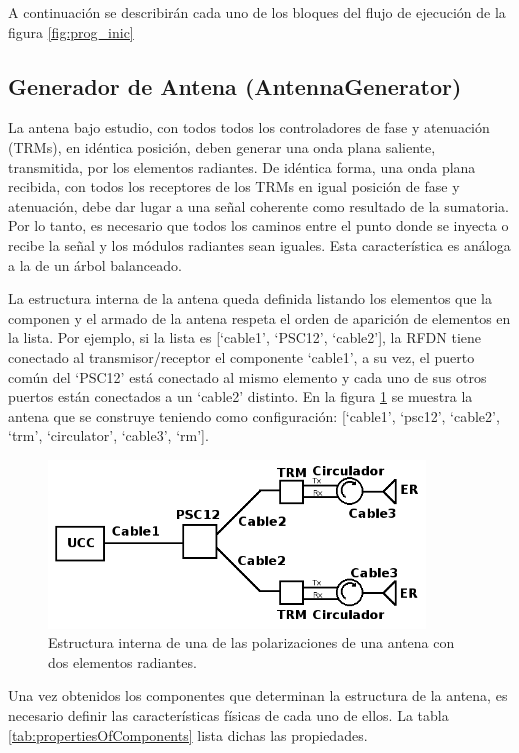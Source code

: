 A continuación se describirán cada uno de los bloques del flujo de ejecución de la figura \ref{fig:prog_inic}

\subsection{Generador de Antena (AntennaGenerator)}

La antena bajo estudio, con todos todos los controladores de fase y atenuación (TRMs), en idéntica posición, deben generar una
onda plana saliente, transmitida, por los elementos radiantes. De idéntica forma, una onda plana recibida, con todos los
receptores de los TRMs en igual posición de fase y atenuación, debe dar lugar a una señal coherente como resultado de la
sumatoria. Por lo tanto, es necesario que todos los caminos entre el punto donde se inyecta o recibe la señal y los módulos 
radiantes sean iguales. Esta característica es análoga a la de un árbol balanceado. 

La estructura interna de la antena queda definida listando los elementos que la componen y el armado de la antena respeta el
orden de aparición de elementos en la lista. Por ejemplo, si la lista es [\enquote*{cable1}, \enquote*{PSC12},
\enquote*{cable2}], la RFDN tiene conectado al transmisor/receptor el componente \enquote*{cable1}, a su vez, el puerto común
del \enquote*{PSC12} está conectado al mismo elemento y cada uno de sus otros puertos están conectados a un \enquote*{cable2}
distinto. En la figura \ref{fig:2RMAntenna} se muestra la antena que se construye teniendo como configuración:
[\enquote*{cable1}, \enquote*{psc12}, \enquote*{cable2}, \enquote*{trm}, \enquote*{circulator}, \enquote*{cable3},
\enquote*{rm}].

\begin{figure}
 \centering
 \includegraphics[width=10cm]{gfx/RFDN.png}
 \caption{Estructura interna de una de las polarizaciones de una antena con dos elementos radiantes.}
 \label{fig:2RMAntenna}
\end{figure}

Una vez obtenidos los componentes que determinan la estructura de la antena, es necesario definir las características físicas de
cada uno de ellos. La tabla \ref{tab:propertiesOfComponents} lista dichas las propiedades.

